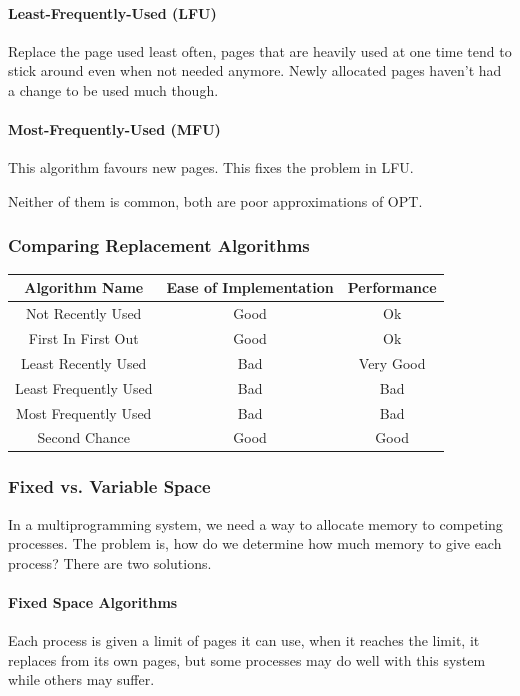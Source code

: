\documentclass{article}
\begin{document}
\paragraph{Least-Frequently-Used (LFU)} Replace the page used least often, pages that are heavily used at one time tend to stick around even when not needed anymore. Newly allocated pages haven't had a change to be used much though.

\paragraph{Most-Frequently-Used (MFU)} This algorithm favours new pages. This fixes the problem in LFU.

Neither of them is common, both are poor approximations of OPT.

\subsubsection{Comparing Replacement Algorithms}

\begin{center}
 \begin{tabular}{||c c c||}
 \hline
 Algorithm Name & Ease of Implementation & Performance \\ [0.5ex]
 \hline\hline
 Not Recently Used & Good & Ok \\
 \hline
 First In First Out & Good & Ok\\
 \hline
 Least Recently Used & Bad & Very Good\\
 \hline
 Least Frequently Used & Bad & Bad\\
 \hline
 Most Frequently Used & Bad & Bad\\
 \hline
 Second Chance & Good & Good\\ [1ex]
 \hline
\end{tabular}
\end{center}


\subsubsection{Fixed vs. Variable Space}

In a multiprogramming system, we need a way to allocate memory to competing processes. The problem is, how do we determine how much memory to give each process? There are two solutions.

\paragraph{Fixed Space Algorithms} Each process is given a limit of pages it can use, when it reaches the limit, it replaces from its own pages, but some processes may do well with this system while others may suffer.
\end{document}

